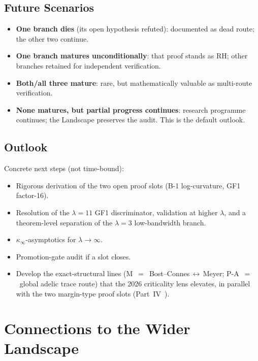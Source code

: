 \documentclass[12pt,a4paper]{article}
\theoremstyle{definition}
\theoremstyle{remark}
\begin{document}
\subsection{Future Scenarios}

\begin{itemize}
  \item \textbf{One branch dies} (its open hypothesis refuted):
    documented as dead route; the other two continue.
  \item \textbf{One branch matures unconditionally}: that proof stands
    as RH; other branches retained for independent verification.
  \item \textbf{Both/all three mature}: rare, but mathematically
    valuable as multi-route verification.
  \item \textbf{None matures, but partial progress continues}: research
    programme continues; the Landscape preserves the audit. This is the
    default outlook.
\end{itemize}


\subsection{Outlook}

Concrete next steps (not time-bound):
\begin{itemize}
  \item Rigorous derivation of the two open proof slots (B-1
    log-curvature, GF1 factor-16).
  \item Resolution of the $\lambda=11$ GF1 discriminator, validation at
    higher $\lambda$, and a theorem-level separation of the $\lambda=3$
    low-bandwidth branch.
  \item $\kappa_\infty$-asymptotics for $\lambda \to \infty$.
  \item Promotion-gate audit if a slot closes.
  \item Develop the exact-structural lines (M~$=$~Bost--Connes\,$\leftrightarrow$\,Meyer;
    P-A~$=$~global adelic trace route) that the 2026 criticality lens elevates, in
    parallel with the two margin-type proof slots (Part~IV~\cite{Geiger2026partIV}).
\end{itemize}


\section{Connections to the Wider Landscape}
\label{sec:connections}
\end{document}
